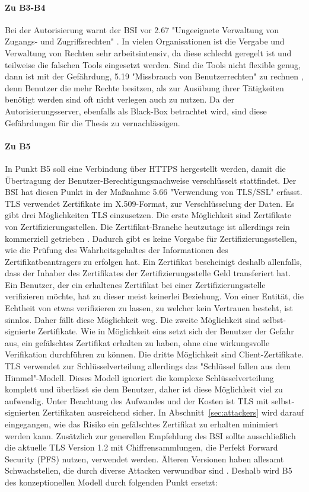 \documentclass[11pt,a4paper]{report}
\begin{document}
\paragraph{Zu B3-B4} Bei der Autorisierung warnt der BSI vor 2.67 "Ungeeignete Verwaltung von Zugangs- und Zugriffsrechten" \cite{bsi_g2067}. In vielen Organisationen ist die Vergabe und Verwaltung von Rechten sehr arbeitsintensiv, da diese schlecht geregelt ist und teilweise die falschen Tools eingesetzt werden. Sind die Tools nicht flexible genug, dann ist mit der Gefährdung,  5.19 "Missbrauch von Benutzerrechten" zu rechnen \cite{bsi_g5019}, denn Benutzer die mehr Rechte besitzen, als zur Ausübung ihrer Tätigkeiten benötigt werden sind oft nicht verlegen auch zu nutzen. Da der Autorisierungsserver, ebenfalls als Black-Box betrachtet wird, sind diese Gefährdungen für die Thesis zu vernachlässigen. 

\paragraph{Zu B5} In Punkt B5 soll eine Verbindung über HTTPS hergestellt werden, damit die Übertragung der Benutzer-Berechtigungsnachweise verschlüsselt stattfindet. Der BSI hat diesen Punkt in der Maßnahme 5.66 "Verwendung von TLS/SSL" \cite{bsi_m5066} erfasst. TLS verwendet Zertifikate im X.509-Format, zur Verschlüsselung der Daten. Es gibt drei Möglichkeiten TLS einzusetzen. Die erste Möglichkeit sind Zertifikate von Zertifizierungsstellen. Die Zertifikat-Branche heutzutage ist allerdings rein kommerziell getrieben \cite[s.~50]{gutmann}. Dadurch gibt es keine Vorgabe für Zertifizierungsstellen, wie die Prüfung des Wahrheitsgehaltes der Informationen des Zertifikatbeantragers zu erfolgen hat. Ein Zertifikat bescheinigt deshalb allenfalls, dass der Inhaber des Zertifikates der Zertifizierungsstelle Geld transferiert hat. Ein Benutzer, der ein erhaltenes Zertifikat bei einer Zertifizierungsstelle verifizieren möchte, hat zu dieser meist keinerlei Beziehung. Von einer Entität, die Echtheit von etwas verifizieren zu lassen, zu welcher kein Vertrauen besteht, ist sinnlos. Daher fällt diese Möglichkeit weg. Die zweite Möglichkeit sind selbst-signierte Zertifikate. Wie in Möglichkeit eins setzt sich der Benutzer der Gefahr aus, ein gefälschtes Zertifikat erhalten zu haben, ohne eine wirkungsvolle Verifikation durchführen zu können. Die dritte Möglichkeit sind Client-Zertifikate. TLS verwendet zur Schlüsselverteilung allerdings das "Schlüssel fallen aus dem Himmel"-Modell. Dieses Modell ignoriert die komplexe Schlüsselverteilung komplett und überlässt sie dem Benutzer, daher ist diese Möglichkeit viel zu aufwendig. Unter Beachtung des Aufwandes und der Kosten ist TLS mit selbst-signierten Zertifikaten ausreichend sicher. In Abschnitt~\ref{sec:attackers} wird darauf eingegangen, wie das Risiko ein gefälschtes Zertifikat zu erhalten minimiert werden kann. Zusätzlich zur generellen Empfehlung des BSI sollte ausschließlich die aktuelle TLS Version 1.2 mit Chiffrensammlungen, die Perfekt Forward Security (PFS) nutzen, verwendet werden. Älteren Versionen haben allesamt Schwachstellen, die durch diverse Attacken verwundbar sind \cite{ssl_lighttpd}. Deshalb wird B5 des konzeptionellen Modell durch folgenden Punkt ersetzt:
\end{document}

